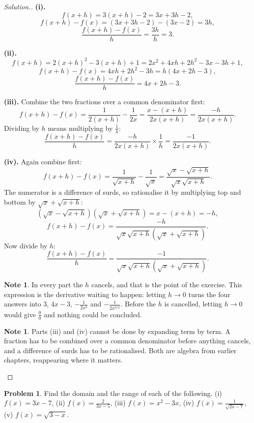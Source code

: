 \documentclass[11pt,a4paper]{article}
\theoremstyle{definition}
\newtheorem{note}[thm]{Note}
\newtheorem{problemx}{Problem}[section]
\newenvironment{problem}{\begin{problemx}}{\end{problemx}}
\newenvironment{solution}
  {\renewcommand{\qedsymbol}{}\begin{proof}[\textit{Solution}.]}
  {\end{proof}}
\begin{document}
\begin{solution}
\textbf{(i).}
$$f(x+h)=3(x+h)-2=3x+3h-2,$$
$$f(x+h)-f(x)=(3x+3h-2)-(3x-2)=3h,$$
$$\frac{f(x+h)-f(x)}{h}=\frac{3h}{h}=3.$$

\textbf{(ii).}
$$f(x+h)=2(x+h)^2-3(x+h)+1=2x^2+4xh+2h^2-3x-3h+1,$$
$$f(x+h)-f(x)=4xh+2h^2-3h=h(4x+2h-3),$$
$$\frac{f(x+h)-f(x)}{h}=4x+2h-3.$$

\textbf{(iii).} Combine the two fractions over a common denominator first:
$$f(x+h)-f(x)=\frac{1}{2(x+h)}-\frac{1}{2x}=\frac{x-(x+h)}{2x(x+h)}=\frac{-h}{2x(x+h)}.$$
Dividing by $h$ means multiplying by $\frac{1}{h}$:
$$\frac{f(x+h)-f(x)}{h}=\frac{-h}{2x(x+h)}\times\frac{1}{h}=\frac{-1}{2x(x+h)}.$$

\textbf{(iv).} Again combine first:
$$f(x+h)-f(x)=\frac{1}{\sqrt{x+h}}-\frac{1}{\sqrt{x}}
=\frac{\sqrt{x}-\sqrt{x+h}}{\sqrt{x}\sqrt{x+h}}.$$
The numerator is a difference of surds, so rationalise it by multiplying top and bottom
by $\sqrt{x}+\sqrt{x+h}$:
$$\left(\sqrt{x}-\sqrt{x+h}\right)\left(\sqrt{x}+\sqrt{x+h}\right)=x-(x+h)=-h,$$
$$f(x+h)-f(x)=\frac{-h}{\sqrt{x}\sqrt{x+h}\left(\sqrt{x}+\sqrt{x+h}\right)}.$$
Now divide by $h$:
$$\frac{f(x+h)-f(x)}{h}
=\frac{-1}{\sqrt{x}\sqrt{x+h}\left(\sqrt{x}+\sqrt{x+h}\right)}.$$

\begin{note}
In every part the $h$ cancels, and that is the point of the exercise. This expression is
the derivative waiting to happen: letting $h\to 0$ turns the four answers into $3$,
$4x-3$, $-\frac{1}{2x^2}$ and $-\frac{1}{2x^{3/2}}$. Before the $h$ is cancelled,
letting $h\to 0$ would give $\frac{0}{0}$ and nothing could be concluded.
\end{note}

\begin{note}
Parts (iii) and (iv) cannot be done by expanding term by term. A fraction has to be
combined over a common denominator before anything cancels, and a difference of surds
has to be rationalised. Both are algebra from earlier chapters, reappearing where it
matters.
\end{note}
\end{solution}

\begin{problem}
Find the domain and the range of each of the following.
\quad (i) $f(x)=3x-7$, \quad (ii) $f(x)=\frac{2}{3x-5}$, \quad
(iii) $f(x)=x^2-3x$, \quad (iv) $f(x)=\frac{1}{\sqrt{2x-7}}$, \quad
(v) $f(x)=\sqrt{3-x}$.
\end{problem}
\end{document}
